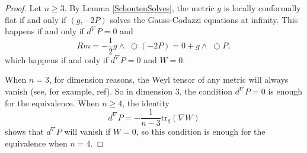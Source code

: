\documentclass{amsart}
\newcommand{\tr}{\mathrm{tr}}
\newcommand{\wtimes}{\wedge \!\!\!\!\!\!\!\!\;\bigcirc}
\begin{document}
\begin{proof}
Let $n \geq 3$. 
By Lemma \ref{SchoutenSolves}, the metric $g$ is locally conformally flat if and only if $(g,-2P)$ solves the Gauss-Codazzi equations at infinity.
This happens if and only if $d^{\nabla}P = 0$ and 
\[
Rm = -\frac{1}{2}g\wtimes (-2P) = 0 + g \wtimes P,
\]
which happens if and only if $d^\nabla P = 0$ and $W = 0$.

When $n = 3$, for dimension reasons, the Weyl tensor of any metric will always vanish (see, for example, ref).
So in dimension 3, the condition $d^\nabla P = 0$ is enough for the equivalence.
When $n \geq 4$, the identity
\[
d^\nabla P = -\frac{1}{n-3}\tr_g(\nabla W)
\]
shows that $d^\nabla P$ will vanish if $W=0$, so this condition is enough for the equivalence when $n=4$.
\end{proof}


 
\end{document}
